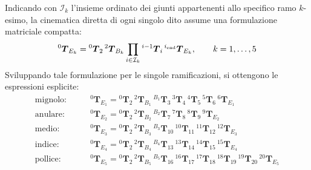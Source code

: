 Indicando con $\mathcal I_k$ l'insieme ordinato dei giunti appartenenti allo specifico ramo $k$-esimo, la cinematica diretta di ogni singolo dito assume una formulazione matriciale compatta:
\begin{equation}
    {}^0\boldsymbol{T}_{E_k} = {}^0\boldsymbol{T}_2\,{}^2\boldsymbol{T}_{B_k} \prod_{i\in\mathcal I_k}{}^{i-1}\boldsymbol{T}_i\,{}^{i_{\rm end}}\boldsymbol{T}_{E_k}, \qquad k=1,\ldots,5
\end{equation}
Sviluppando tale formulazione per le singole ramificazioni, si ottengono le espressioni esplicite:
\begin{align*}
    \text{mignolo:} \qquad & {}^0\boldsymbol{T}_{E_1} = {}^0\boldsymbol{T}_2\,{}^2\boldsymbol{T}_{B_1}\,{}^{B_1}\boldsymbol{T}_3\,{}^3\boldsymbol{T}_4\,{}^4\boldsymbol{T}_5\,{}^5\boldsymbol{T}_6\,{}^6\boldsymbol{T}_{E_1} \\
    \text{anulare:} \qquad & {}^0\boldsymbol{T}_{E_2} = {}^0\boldsymbol{T}_2\,{}^2\boldsymbol{T}_{B_2}\,{}^{B_2}\boldsymbol{T}_7\,{}^7\boldsymbol{T}_8\,{}^8\boldsymbol{T}_9\,{}^9\boldsymbol{T}_{E_2} \\
    \text{medio:} \qquad & {}^0\boldsymbol{T}_{E_3} = {}^0\boldsymbol{T}_2\,{}^2\boldsymbol{T}_{B_3}\,{}^{B_3}\boldsymbol{T}_{10}\,{}^{10}\boldsymbol{T}_{11}\,{}^{11}\boldsymbol{T}_{12}\,{}^{12}\boldsymbol{T}_{E_3} \\
    \text{indice:} \qquad & {}^0\boldsymbol{T}_{E_4} = {}^0\boldsymbol{T}_2\,{}^2\boldsymbol{T}_{B_4}\,{}^{B_4}\boldsymbol{T}_{13}\,{}^{13}\boldsymbol{T}_{14}\,{}^{14}\boldsymbol{T}_{15}\,{}^{15}\boldsymbol{T}_{E_4} \\
    \text{pollice:} \qquad & {}^0\boldsymbol{T}_{E_5} = {}^0\boldsymbol{T}_2\,{}^2\boldsymbol{T}_{B_5}\,{}^{B_5}\boldsymbol{T}_{16}\,{}^{16}\boldsymbol{T}_{17}\,{}^{17}\boldsymbol{T}_{18}\,{}^{18}\boldsymbol{T}_{19}\,{}^{19}\boldsymbol{T}_{20}\,{}^{20}\boldsymbol{T}_{E_5}
\end{align*}

